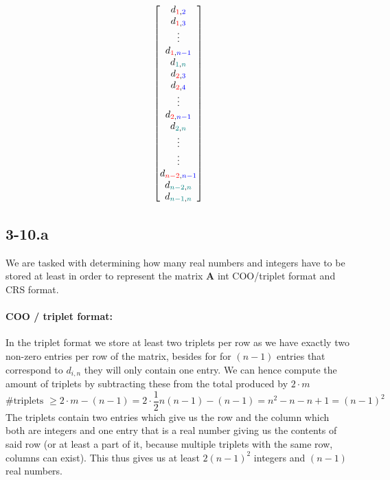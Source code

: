 \documentclass{article}
\begin{document}
\begin{equation*}
\begin{bmatrix}
        d_{\color{red}1\color{black},\color{blue}2\color{black}} \\
        d_{\color{red}1\color{black},\color{blue}3\color{black}} \\
        \vdots \\
        d_{\color{red}1\color{black},\color{blue}n-1\color{black}} \\
        d_{\color{teal}1\color{black},\color{teal}n\color{black}} \\
        d_{\color{red}2\color{black},\color{blue}3\color{black}} \\
        d_{\color{red}2\color{black},\color{blue}4\color{black}} \\
        \vdots  \\
        d_{\color{red}2\color{black},\color{blue}n-1\color{black}} \\
        d_{\color{teal}2\color{black},\color{teal}n\color{black}} \\
        \vdots  \\
         \vdots \\
         d_{\color{red}n-2\color{black},\color{blue}n-1\color{black}} \\
         d_{\color{teal}n-2\color{black},\color{teal}n\color{black}} \\
         d_{\color{teal}n-1\color{black},\color{teal}n\color{black}}
    \end{bmatrix}
\end{equation*}
\subsection*{3-10.a}
We are tasked with determining how many real numbers and integers have to be stored at least in order to represent the matrix $\mathbf{A}$ int COO/triplet format and CRS format.

\paragraph{COO / triplet format:} In the triplet format we store at least two triplets per row as we have exactly two non-zero entries per row of the matrix, besides for for $\left(n-1\right)$ entries that correspond to $d_{i,n}$ they will only contain one entry. We can hence compute the amount of triplets by subtracting these from the total produced by $2 \cdot m$
\begin{equation*}
    \text{\# triplets } \geq 2 \cdot m - \left(n-1\right) = 2 \cdot \frac{1}{2}n\left(n-1\right) - \left(n-1\right) = n^{2} - n - n + 1 = \left(n-1\right)^{2}
\end{equation*}
The triplets contain two entries which give us the row and the column which both are integers and one entry that is a real number giving us the contents of said row (or at least a part of it, because multiple triplets with the same row, columns can exist). This thus gives us at least $2\left(n-1\right)^{2}$ integers and $\left(n-1\right)$ real numbers.
\end{document}

